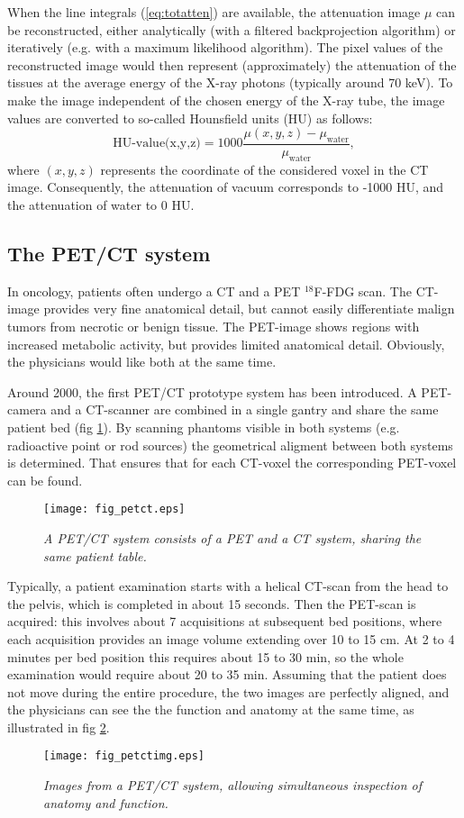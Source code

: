 When the line integrals (\ref{eq:totatten}) are available, the
attenuation image $\mu$ can be reconstructed, either analytically
(with a filtered backprojection algorithm) or iteratively (e.g. with a
maximum likelihood algorithm). The pixel values of the reconstructed
image would then represent (approximately) the attenuation of the
tissues at the average energy of the X-ray photons (typically around
70 keV). To make the image independent of the chosen energy of the
X-ray tube, the image values are converted to so-called Hounsfield
units (HU) as follows:
\begin{equation}
  \mbox{HU-value(x,y,z)} 
    = 1000 \frac{\mu(x,y,z) - \mu_{\mbox{water}}}{\mu_{\mbox{water}}},
\end{equation}
where $(x,y,z)$ represents the coordinate of the considered voxel in
the CT image.  Consequently, the attenuation of vacuum corresponds to
-1000 HU, and the attenuation of water to 0 HU.

\subsection{The PET/CT system}
In oncology, patients often undergo a CT and a PET $^{18}$F-FDG scan. The
CT-image provides very fine anatomical detail, but cannot easily differentiate
malign tumors from necrotic or benign tissue. The PET-image shows regions with
increased metabolic activity, but provides limited anatomical detail.
Obviously, the physicians would like both at the same time.

Around 2000, the first PET/CT prototype system has been introduced. A
PET-camera and a CT-scanner are combined in a single gantry and share
the same patient bed (fig \ref{fig:petct}). By scanning phantoms
visible in both systems (e.g. radioactive point or rod sources) the
geometrical aligment between both systems is determined. That ensures
that for each CT-voxel the corresponding PET-voxel can be found.
%
\begin{figure}[tbp]
\centering
\texttt{[image: fig\_petct.eps]}
\caption{\label{fig:petct} \emph{A PET/CT system consists of a PET and
 a CT system, sharing the same patient table.}}
\end{figure}

Typically, a patient examination starts with a helical CT-scan from the
head to the pelvis, which is completed in about 15 seconds. Then the
PET-scan is acquired: this involves about 7 acquisitions at subsequent
bed positions, where each acquisition provides an image volume
extending over 10 to 15 cm. At 2 to 4 minutes per bed position this
requires about 15 to 30 min, so the whole examination would require
about 20 to 35 min. Assuming that the patient does not move during the
entire procedure, the two images are perfectly aligned, and the
physicians can see the the function and anatomy at the same time, as
illustrated in fig \ref{fig:petctimg}.
%
\begin{figure}[tb]
\centering
\texttt{[image: fig\_petctimg.eps]}
\caption{\label{fig:petctimg} \emph{Images from a PET/CT system, allowing
simultaneous inspection of anatomy and function.}}
\end{figure}

